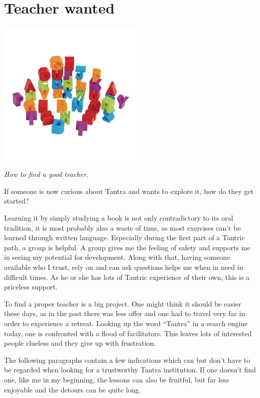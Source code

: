 \section{Teacher wanted}

\begin{center}
\includegraphics[width=7cm]{images/07_teacher}
\end{center}

\textit{How to find a good teacher.}

If someone is now curious about Tantra and wants to explore it, how do they  get started?

Learning it by simply studying a book is not only contradictory to its oral tradition, it is most probably also a waste of time, as most exercises can't be learned through written language. Especially during the first part of a Tantric path, a group is helpful. A group gives me the feeling of safety and supports me in seeing my potential for development. Along with that, having someone available who I trust, rely on and can ask questions helps me when in need in difficult times. As he or she has lots of Tantric experience of their own, this is a priceless support.

To find a proper teacher is a big project. One might think it should be easier these days, as in the past there was less offer and one had to travel very far in order to experience a retreat. Looking up the word ``Tantra'' in a search engine today, one is confronted with a flood of facilitators. This leaves lots of interested people clueless and they give up with frustration.

The following paragraphs contain a few indications which can but don't have to be regarded when looking for a trustworthy Tantra institution. If one doesn't find one, like me in my beginning, the lessons can also be fruitful, but far less enjoyable and the detours can be quite long.

